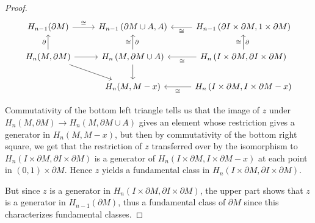 \documentclass[reqno]{amsart}
\theoremstyle{definition}
\theoremstyle{remark}
\begin{document}
\begin{proof}
    \begin{equation*}
    \begin{tikzcd}
        H_{n-1}(\partial M) \ar[r, "\cong"] &
        H_{n-1}\left( \partial M \cup A, A \right) &
        H_{n-1}\left( \partial I \times \partial M,
        1 \times \partial M \right) \ar[l, "\cong"] \\
        H_n (M, \partial M) \ar[r] \ar[u, "\partial"]
        \ar[dr]&
        H_n \left( M, \partial M \cup  A \right) 
        \ar[u, "\cong", "\partial"'] 
        \ar[d]&
        H_n \left( I \times \partial M , \partial I 
        \times \partial M\right) \ar[l, "\cong"] 
        \ar[u, "\cong", "\partial"'] \\
        & H_n (M, M-x) & H_n \left( I \times \partial M,
        I \times \partial M - x \right) 
        \ar[l, "\cong"]
    \end{tikzcd}
    \end{equation*}

    Commutativity of the bottom left triangle tells us that
    the image of $z$ under 
    $H_n \left( M, \partial M \right) 
    \to H_n \left( M, \partial M \cup A \right) $ 
    gives an element whose restriction
    gives a generator in $H_n \left( M, M - x \right) $, but
    then by commutativity of the bottom right square,
    we get that the restriction of $z$ transferred over
    by the isomorphism to
    $H_n \left( I \times \partial M, \partial I \times 
    \partial M \right) $ is a generator of
    $H_n \left( I \times \partial M, I \times \partial M
    - x\right) $ at each point in $(0,1) \times \partial M$. Hence
    $z$ yields a fundamental class
    in $H_n \left( I \times \partial M,
    \partial I \times \partial M \right) $.

    But since $z$ is a generator in
    $H_n \left( I \times \partial M, \partial I \times 
    \partial M\right) $, the upper part shows that
    $z$ is a generator in
    $H_{n-1}(\partial M)$, thus a fundamental class
    of $\partial M$ since this characterizes fundamental classes.

\end{proof}
\end{document}

